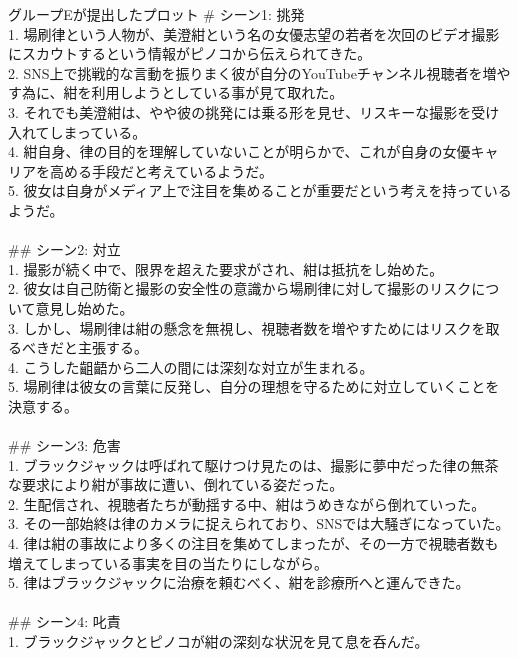 \documentclass[a4j,12pt]{jsreport}
\begin{document}
\vspace{20pt}
\begin{breakitembox}
   [l]{グループEが提出したプロット}
   \noindent \# シーン1: 挑発\\
   1. 場刷律という人物が、美澄紺という名の女優志望の若者を次回のビデオ撮影にスカウトするという情報がピノコから伝えられてきた。\\
   2. SNS上で挑戦的な言動を振りまく彼が自分のYouTubeチャンネル視聴者を増やす為に、紺を利用しようとしている事が見て取れた。\\
   3. それでも美澄紺は、やや彼の挑発には乗る形を見せ、リスキーな撮影を受け入れてしまっている。\\
   4. 紺自身、律の目的を理解していないことが明らかで、これが自身の女優キャリアを高める手段だと考えているようだ。\\
   5. 彼女は自身がメディア上で注目を集めることが重要だという考えを持っているようだ。\\
   \\
   \#\# シーン2: 対立\\
   1. 撮影が続く中で、限界を超えた要求がされ、紺は抵抗をし始めた。\\
   2. 彼女は自己防衛と撮影の安全性の意識から場刷律に対して撮影のリスクについて意見し始めた。\\
   3. しかし、場刷律は紺の懸念を無視し、視聴者数を増やすためにはリスクを取るべきだと主張する。\\
   4. こうした齟齬から二人の間には深刻な対立が生まれる。\\
   5. 場刷律は彼女の言葉に反発し、自分の理想を守るために対立していくことを決意する。\\
   \\
   \#\# シーン3: 危害\\
   1. ブラックジャックは呼ばれて駆けつけ見たのは、撮影に夢中だった律の無茶な要求により紺が事故に遭い、倒れている姿だった。\\
   2. 生配信され、視聴者たちが動揺する中、紺はうめきながら倒れていった。\\
   3. その一部始終は律のカメラに捉えられており、SNSでは大騒ぎになっていた。\\
   4. 律は紺の事故により多くの注目を集めてしまったが、その一方で視聴者数も増えてしまっている事実を目の当たりにしながら。\\
   5. 律はブラックジャックに治療を頼むべく、紺を診療所へと運んできた。\\
   \\
   \#\# シーン4: 叱責\\
   1. ブラックジャックとピノコが紺の深刻な状況を見て息を呑んだ。\\

\end{breakitembox}
\end{document}
